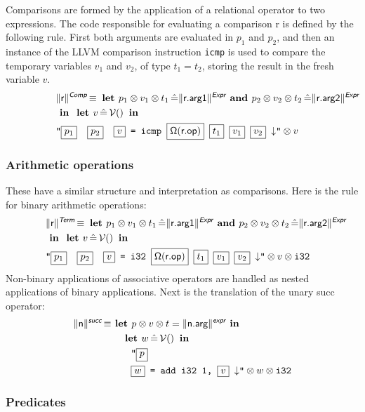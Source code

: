 \documentclass{llncs}
\newcommand{\trad}[2]{\ensuremath{\lVert \textsf{#1} \rVert^{\textit{#2}}}}
\newcommand{\nl}[0]{\ensuremath{\downarrow}}
\DeclareMathOperator{\isdef}{\equiv}
\DeclareMathOperator{\variable}{\mathcal{V}()}
\newcommand{\llvm}[1]{\texttt{#1}}
\newcommand{\B}[1]{\textsf{#1}}
\newcommand{\LET}[0]{\textbf{ let }}
\DeclareMathOperator{\BE}{\hat{=}}
\newcommand{\IN}[0]{\textbf{ in }}
\newcommand{\AND}[0]{\textbf{ and }}
\newcommand{\PH}[1]{\framebox{$#1$}}
\newcommand{\sep}[0]{\otimes}
\newcommand{\opmap}[0]{\ensuremath{\sf\Omega}}
\begin{document}
Comparisons are formed by the application of a relational operator to
two expressions. The code responsible for evaluating a comparison
\B{r} is defined by the following rule. First both arguments are
evaluated in $p_1$ and $p_2$, and then an instance of the LLVM
comparison instruction \llvm{icmp} is used to compare the temporary
variables $v_1$ and $v_2$, of type $t_1 = t_2$, storing the result in
the fresh variable $v$.
\begin{align*}
\lefteqn{\trad{r}{\B{Comp}} \isdef
  \LET
  p_1 \sep v_1 \sep t_1 \BE \trad{r.arg1}{\B{Expr}} \AND
  p_2 \sep v_2 \sep t_2 \BE \trad{r.arg2}{\B{Expr}}} \\
& \IN \LET v \BE \variable \IN \\
& \llvm{"\PH{p_1}\quad\PH{p_2}\quad\PH{v} = icmp \PH{\opmap(\B{r.op})} \PH{t_1} \PH{v_1} \PH{v_2} \nl"} \sep v
\end{align*}

\subsubsection{Arithmetic operations} 

These have a similar structure and interpretation as comparisons. Here
is the rule for binary arithmetic operations:
\begin{align*}
\lefteqn{\trad{r}{\B{Term}} \isdef
  \LET
  p_1 \sep v_1 \sep t_1 \BE \trad{r.arg1}{\B{Expr}} \AND
  p_2 \sep v_2 \sep t_2 \BE \trad{r.arg2}{\B{Expr}}} \\
& \IN \LET v \BE \variable \IN \\
& \llvm{"\PH{p_1}\quad\PH{p_2}\quad\PH{v} = i32 \PH{\opmap(\B{r.op})} \PH{t_1} \PH{v_1} \PH{v_2} \nl"} \sep v \sep \llvm{i32}
\end{align*}
Non-binary applications of associative operators are handled as nested
applications of binary applications. Next is the translation of the unary
\B{succ} operator:
\begin{align*}
  \trad{n}{\B{succ}} \isdef & \textbf{ let } p \sep v \sep t = \trad{n.arg}{\B{expr}} \IN  \\
  & \quad \LET w \BE \variable \IN \\
  & \quad \quad \llvm{"\PH{p}} \\
  & \quad \quad \llvm{\PH{w} = add i32 1, \PH{v} \nl"} \sep w \sep \llvm{i32}
\end{align*}

\subsubsection{Predicates}
\end{document}
